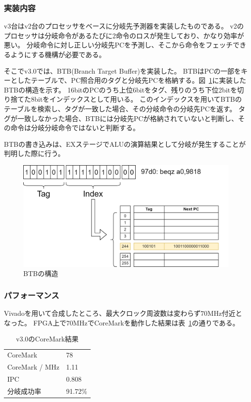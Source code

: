 \documentclass[dvipdfmx,10pt,a4paper,titlepage]{jsarticle}
\begin{document}
    \subsubsection{実装内容}
    v3台はv2台のプロセッサをベースに分岐先予測器を実装したものである。
    v2のプロセッサは分岐命令があるたびに2命令のロスが発生しており、かなり効率が悪い。
    分岐命令に対し正しい分岐先PCを予測し、そこから命令をフェッチできるようにする機構が必要である。

    そこでv3.0では、BTB(Branch Target Buffer)を実装した。
    BTBはPCの一部をキーとしたテーブルで、PC照合用のタグと分岐先PCを格納する。図~\ref{fig:btb}に実装したBTBの構造を示す。
    16bitのPCのうち上位6bitをタグ、残りのうち下位2bitを切り捨てた8bitをインデックスとして用いる。
    このインデックスを用いてBTBのテーブルを検索し、タグが一致した場合、その分岐命令の分岐先PCを返す。
    タグが一致しなかった場合、BTBには分岐先PCが格納されていないと判断し、その命令は分岐分岐命令ではないと判断する。
    
    BTBの書き込みは、EXステージでALUの演算結果として分岐が発生することが判明した際に行う。
    \begin{figure}
        \centering
        \includegraphics[width=12cm]{figure/btb.png}
        \caption{BTBの構造}\label{fig:btb}
    \end{figure}
    \subsubsection{パフォーマンス}
    Vivadoを用いて合成したところ、最大クロック周波数は変わらず$70\mathrm{MHz}$付近となった。
    FPGA上で$70\mathrm{MHz}$でCoreMarkを動作した結果は表~\ref{tab:v3.0}の通りである。
    \begin{table}[h]
        \begin{center}
            \caption{v3.0のCoreMark結果}\label{tab:v3.0}
            \begin{tabular}{ll}
                CoreMark & 78 \\
                CoreMark / MHz & 1.11 \\
                IPC & 0.808 \\
                分岐成功率 & 91.72\% \\
            \end{tabular}
        \end{center}
    \end{table}
\end{document}
